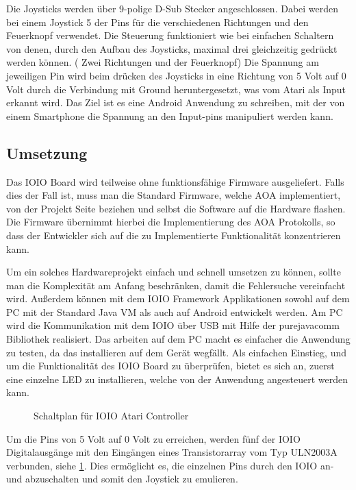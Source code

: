 \documentclass[12pt,journal,compsoc]{IEEEtran}
\begin{document}
Die Joysticks werden über 9-polige D-Sub Stecker angeschlossen.
Dabei werden bei einem Joystick 5 der Pins für die verschiedenen Richtungen und den Feuerknopf verwendet.
Die Steuerung funktioniert wie bei einfachen Schaltern von denen, durch den Aufbau des Joysticks, maximal drei gleichzeitig gedrückt werden können. ( Zwei Richtungen und der Feuerknopf)
Die Spannung am jeweiligen Pin wird beim drücken des Joysticks in eine Richtung von 5 Volt auf 0 Volt durch die Verbindung mit Ground heruntergesetzt, was vom Atari als Input erkannt wird.
Das Ziel ist es eine Android Anwendung zu schreiben, mit der von einem Smartphone die Spannung an den Input-pins manipuliert werden kann.

\subsection{Umsetzung}
Das IOIO Board wird teilweise ohne funktionsfähige Firmware ausgeliefert. Falls dies der Fall ist, muss man die Standard Firmware, welche AOA implementiert, von der Projekt Seite beziehen und selbst die Software auf die Hardware flashen.
Die Firmware übernimmt hierbei die Implementierung des AOA Protokolls, so dass der Entwickler sich auf die zu Implementierte Funktionalität konzentrieren kann.

Um ein solches Hardwareprojekt einfach und schnell umsetzen zu können, sollte man die Komplexität am Anfang beschränken, damit die Fehlersuche vereinfacht wird.
Außerdem können mit dem IOIO Framework Applikationen sowohl auf dem PC mit der Standard Java VM als auch auf Android entwickelt werden.
Am PC wird die Kommunikation mit dem IOIO über USB mit Hilfe der purejavacomm Bibliothek realisiert.
Das arbeiten auf dem PC macht es einfacher die Anwendung zu testen, da das installieren auf dem Gerät wegfällt.
Als einfachen Einstieg, und um die Funktionalität des IOIO Board zu überprüfen, bietet es sich an, zuerst eine einzelne LED zu installieren, welche von der Anwendung angesteuert werden kann.
\begin{figure}[h]
	\def\svgwidth{\columnwidth}
	
	\caption{Schaltplan für IOIO Atari Controller}
	\label{fig:circuit}
\end{figure}

Um die Pins von 5 Volt auf 0 Volt zu erreichen, werden fünf der IOIO Digitalausgänge mit den Eingängen eines Transistorarray vom Typ ULN2003A verbunden, siehe \ref{fig:circuit}.
Dies ermöglicht es, die einzelnen Pins durch den IOIO an- und abzuschalten und somit den Joystick zu emulieren.
\end{document}
